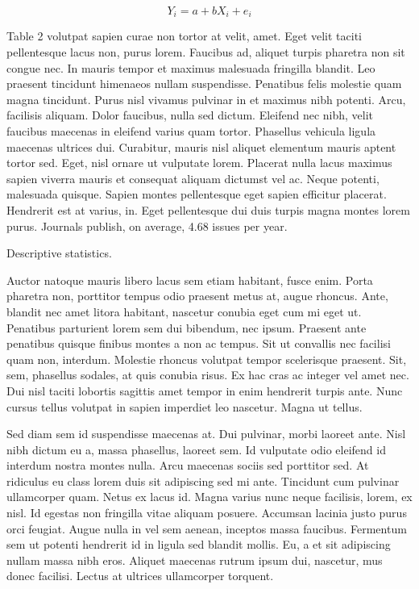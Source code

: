 \documentclass[
  12,
]{article}
\begin{document}
\[Y_{i} = a + bX_{i} + e_{i}\]

Table 2 volutpat sapien curae non tortor at velit, amet. Eget velit
taciti pellentesque lacus non, purus lorem. Faucibus ad, aliquet turpis
pharetra non sit congue nec. In mauris tempor et maximus malesuada
fringilla blandit. Leo praesent tincidunt himenaeos nullam suspendisse.
Penatibus felis molestie quam magna tincidunt. Purus nisl vivamus
pulvinar in et maximus nibh potenti. Arcu, facilisis aliquam. Dolor
faucibus, nulla sed dictum. Eleifend nec nibh, velit faucibus maecenas
in eleifend varius quam tortor. Phasellus vehicula ligula maecenas
ultrices dui. Curabitur, mauris nisl aliquet elementum mauris aptent
tortor sed. Eget, nisl ornare ut vulputate lorem. Placerat nulla lacus
maximus sapien viverra mauris et consequat aliquam dictumst vel ac.
Neque potenti, malesuada quisque. Sapien montes pellentesque eget sapien
efficitur placerat. Hendrerit est at varius, in. Eget pellentesque dui
duis turpis magna montes lorem purus. Journals publish, on average, 4.68
issues per year.

Descriptive statistics.

Auctor natoque mauris libero lacus sem etiam habitant, fusce enim. Porta
pharetra non, porttitor tempus odio praesent metus at, augue rhoncus.
Ante, blandit nec amet litora habitant, nascetur conubia eget cum mi
eget ut. Penatibus parturient lorem sem dui bibendum, nec ipsum.
Praesent ante penatibus quisque finibus montes a non ac tempus. Sit ut
convallis nec facilisi quam non, interdum. Molestie rhoncus volutpat
tempor scelerisque praesent. Sit, sem, phasellus sodales, at quis
conubia risus. Ex hac cras ac integer vel amet nec. Dui nisl taciti
lobortis sagittis amet tempor in enim hendrerit turpis ante. Nunc cursus
tellus volutpat in sapien imperdiet leo nascetur. Magna ut tellus.

Sed diam sem id suspendisse maecenas at. Dui pulvinar, morbi laoreet
ante. Nisl nibh dictum eu a, massa phasellus, laoreet sem. Id vulputate
odio eleifend id interdum nostra montes nulla. Arcu maecenas sociis sed
porttitor sed. At ridiculus eu class lorem duis sit adipiscing sed mi
ante. Tincidunt cum pulvinar ullamcorper quam. Netus ex lacus id. Magna
varius nunc neque facilisis, lorem, ex nisl. Id egestas non fringilla
vitae aliquam posuere. Accumsan lacinia justo purus orci feugiat. Augue
nulla in vel sem aenean, inceptos massa faucibus. Fermentum sem ut
potenti hendrerit id in ligula sed blandit mollis. Eu, a et sit
adipiscing nullam massa nibh eros. Aliquet maecenas rutrum ipsum dui,
nascetur, mus donec facilisi. Lectus at ultrices ullamcorper torquent.
\end{document}

